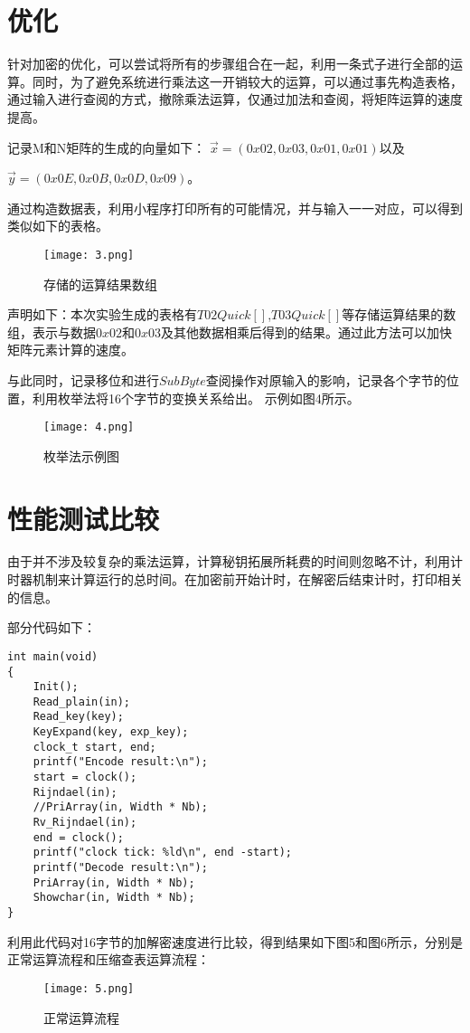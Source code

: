 \documentclass[UTF8]{ctexart}
\begin{document}
\section{优化}
针对加密的优化，可以尝试将所有的步骤组合在一起，利用一条式子进行全部的运算。同时，为了避免系统进行乘法这一开销较大的运算，可以通过事先构造表格，通过输入进行查阅的方式，撤除乘法运算，仅通过加法和查阅，将矩阵运算的速度提高。

记录M和N矩阵的生成的向量如下：
$\vec{x}=(0x02,0x03,0x01,0x01)$以及

$\vec{y}=(0x0E,0x0B,0x0D,0x09)$。

通过构造数据表，利用小程序打印所有的可能情况，并与输入一一对应，可以得到类似如下的表格。

\begin{figure}[htb]
  \centering
  \texttt{[image: 3.png]} 
  \caption{存储的运算结果数组} 
  \label{img} 
\end{figure}
声明如下：本次实验生成的表格有$T02Quick[]$,$T03Quick[]$等存储运算结果的数组，表示与数据$0x02$和$0x03$及其他数据相乘后得到的结果。通过此方法可以加快矩阵元素计算的速度。

与此同时，记录移位和进行$SubByte$查阅操作对原输入的影响，记录各个字节的位置，利用枚举法将16个字节的变换关系给出。
示例如图4所示。

\begin{figure}[htb]
  \centering
  \texttt{[image: 4.png]} 
  \caption{枚举法示例图} 
  \label{img} 
\end{figure}

\section{性能测试比较}
由于并不涉及较复杂的乘法运算，计算秘钥拓展所耗费的时间则忽略不计，利用计时器机制来计算运行的总时间。在加密前开始计时，在解密后结束计时，打印相关的信息。

部分代码如下：
\begin{lstlisting}
int main(void)
{
	Init();
	Read_plain(in);
	Read_key(key);
	KeyExpand(key, exp_key);
	clock_t start, end;
	printf("Encode result:\n");
	start = clock();
	Rijndael(in);
	//PriArray(in, Width * Nb);
	Rv_Rijndael(in);
	end = clock();
	printf("clock tick: %ld\n", end -start);
	printf("Decode result:\n");
	PriArray(in, Width * Nb);
	Showchar(in, Width * Nb);
}
\end{lstlisting}
利用此代码对16字节的加解密速度进行比较，得到结果如下图5和图6所示，分别是正常运算流程和压缩查表运算流程：
\begin{figure}[htb]
  \centering
  \texttt{[image: 5.png]} 
  \caption{正常运算流程} 
  \label{img} 
\end{figure}
\end{document}
